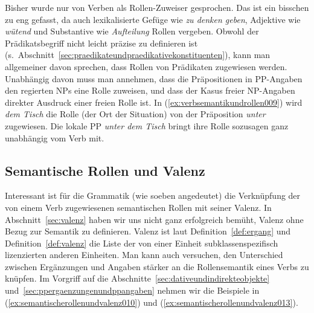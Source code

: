 
Bisher wurde nur von Verben als Rollen-Zuweiser gesprochen.
Das ist ein bisschen zu eng gefasst, da auch lexikalisierte Gefüge wie \textit{zu denken geben}, Adjektive wie \textit{wütend} und Substantive wie \textit{Aufteilung} Rollen vergeben.
Obwohl der Prädikatsbegriff nicht leicht präzise zu definieren ist (s.\ Abschnitt~\ref{sec:praedikateundpraedikativekonstituenten}), kann man allgemeiner davon sprechen, dass Rollen von Prädikaten zugewiesen werden.
Unabhängig davon muss man annehmen, dass die Präpositionen in PP-Angaben den regierten NPs eine Rolle zuweisen, und dass der Kasus freier NP-Angaben direkter Ausdruck einer freien Rolle ist.
In (\ref{ex:verbsemantikundrollen009}) wird \textit{dem Tisch} die Rolle (der Ort der Situation) von der Präposition \textit{unter} zugewiesen.
Die lokale PP \textit{unter dem Tisch} bringt ihre Rolle sozusagen ganz unabhängig vom Verb mit.

\begin{exe}
\end{exe}

\subsection{Semantische Rollen und Valenz}
\label{sec:semantischerollenundvalenz}


Interessant ist für die Grammatik (wie soeben angedeutet) die Verknüpfung der von einem Verb zugewiesenen semantischen Rollen mit seiner Valenz.
In Abschnitt~\ref{sec:valenz} haben wir uns nicht ganz erfolgreich bemüht, Valenz ohne Bezug zur Semantik zu definieren.
Valenz ist laut Definition~\ref{def:ergang} und Definition~\ref{def:valenz} die Liste der von einer Einheit subklassenspezifisch lizenzierten anderen Einheiten.
Man kann auch versuchen, den Unterschied zwischen Ergänzungen und Angaben stärker an die Rollensemantik eines Verbs zu knüpfen.
Im Vorgriff auf die Abschnitte~\ref{sec:dativeundindirekteobjekte} und~\ref{sec:ppergaenzungenundppangaben} nehmen wir die Beispiele in (\ref{ex:semantischerollenundvalenz010}) und (\ref{ex:semantischerollenundvalenz013}).


